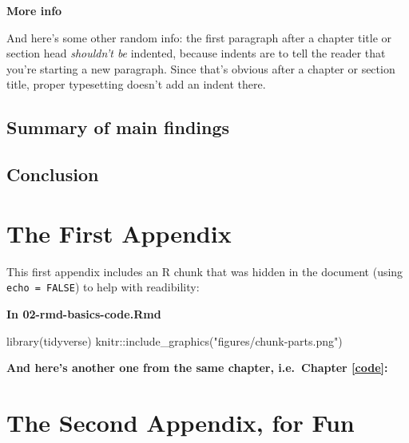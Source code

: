 \documentclass[a4paper, twoside]{templates/ociamthesis}
\newenvironment{Shaded}{\begin{snugshade}}{\end{snugshade}}
\newcommand{\FunctionTok}[1]{\textcolor[rgb]{0.00,0.00,0.00}{#1}}
\newcommand{\NormalTok}[1]{#1}
\newcommand{\SpecialCharTok}[1]{\textcolor[rgb]{0.00,0.00,0.00}{#1}}
\newcommand{\StringTok}[1]{\textcolor[rgb]{0.31,0.60,0.02}{#1}}
\renewenvironment{Shaded}
{
  \vspace{4pt}%
  \begin{snugshade}%
}{%
  \end{snugshade}%
  \vspace{4pt}%
}
\newcommand*{\bibtitle}{Works Cited}
\begin{document}
\textbf{More info}

And here's some other random info: the first paragraph after a chapter title or section head \emph{shouldn't be} indented, because indents are to tell the reader that you're starting a new paragraph. Since that's obvious after a chapter or section title, proper typesetting doesn't add an indent there.

\hypertarget{summary-of-main-findings}{%
\section*{Summary of main findings}\label{summary-of-main-findings}}

\hypertarget{conclusion-3}{%
\section*{Conclusion}\label{conclusion-3}}

\startappendices

\hypertarget{the-first-appendix}{%
\chapter{The First Appendix}\label{the-first-appendix}}

This first appendix includes an R chunk that was hidden in the document (using \texttt{echo\ =\ FALSE}) to help with readibility:

\textbf{In 02-rmd-basics-code.Rmd}

\begin{Shaded}
\begin{Highlighting}[]
\FunctionTok{library}\NormalTok{(tidyverse)}
\NormalTok{knitr}\SpecialCharTok{::}\FunctionTok{include\_graphics}\NormalTok{(}\StringTok{"figures/chunk{-}parts.png"}\NormalTok{)}
\end{Highlighting}
\end{Shaded}

\textbf{And here's another one from the same chapter, i.e.~Chapter \ref{code}:}

\hypertarget{the-second-appendix-for-fun}{%
\chapter{The Second Appendix, for Fun}\label{the-second-appendix-for-fun}}




\setlength{\baselineskip}{0pt} %

{\renewcommand*\MakeUppercase[1]{#1}%
\printbibliography[heading=bibintoc,title={\bibtitle}]}
\end{document}
